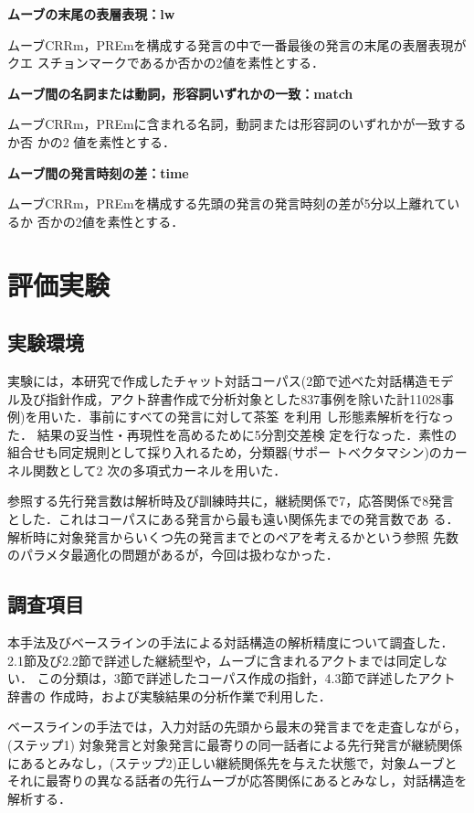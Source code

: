 \begin{description}
\item{\bf ムーブの末尾の表層表現：lw} 

ムーブCRRm，PREmを構成する発言の中で一番最後の発言の末尾の表層表現がクエ
スチョンマークであるか否かの2値を素性とする．

\item{\bf ムーブ間の名詞または動詞，形容詞いずれかの一致：match} 

ムーブCRRm，PREmに含まれる名詞，動詞または形容詞のいずれかが一致するか否
かの2 値を素性とする．

\item{\bf ムーブ間の発言時刻の差：time} 

ムーブCRRm，PREmを構成する先頭の発言の発言時刻の差が5分以上離れているか
否かの2値を素性とする．

\end{description}
\section{評価実験}
\subsection{実験環境}
実験には，本研究で作成したチャット対話コーパス(2節で述べた対話構造モデ
ル及び指針作成，アクト辞書作成で分析対象とした837事例を除いた計11028事
例)を用いた．事前にすべての発言に対して茶筌\cite{Matsumoto:02} を利用
し形態素解析を行なった． 結果の妥当性・再現性を高めるために5分割交差検
定を行なった．素性の組合せも同定規則として採り入れるため，分類器(サポー
トベクタマシン)のカーネル関数として2 次の多項式カーネルを用いた．

参照する先行発言数は解析時及び訓練時共に，継続関係で7，応答関係で8発言
とした．これはコーパスにある発言から最も遠い関係先までの発言数であ
る．解析時に対象発言からいくつ先の発言までとのペアを考えるかという参照
先数のパラメタ最適化の問題があるが，今回は扱わなかった．

\subsection{調査項目}

本手法及びベースラインの手法による対話構造の解析精度について調査した．
2.1節及び2.2節で詳述した継続型や，ムーブに含まれるアクトまでは同定しない．
この分類は，3節で詳述したコーパス作成の指針，4.3節で詳述したアクト辞書の
作成時，および実験結果の分析作業で利用した．

ベースラインの手法では，入力対話の先頭から最末の発言までを走査しながら，
(ステップ1) 対象発言と対象発言に最寄りの同一話者による先行発言が継続関係
にあるとみなし，(ステップ2)正しい継続関係先を与えた状態で，対象ムーブと
それに最寄りの異なる話者の先行ムーブが応答関係にあるとみなし，対話構造を
解析する．

